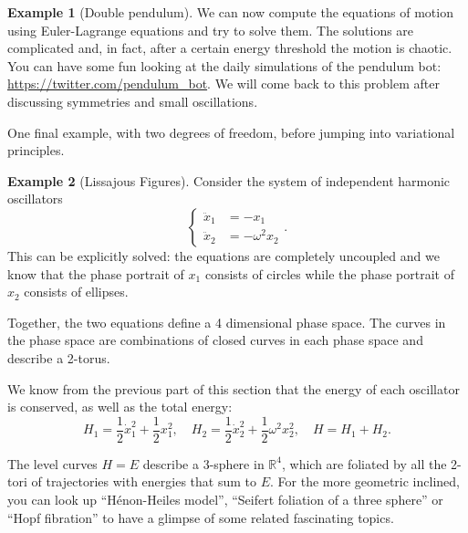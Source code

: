 \documentclass[english,fontsize=11pt,paper=b5]{scrbook}
\theoremstyle{definition}
\newtheorem{example}{Example}[chapter]
\begin{document}
\begin{example}[Double pendulum]
      We can now compute the equations of motion using Euler-Lagrange equations and try to solve them.
      The solutions are complicated and, in fact, after a certain energy threshold the motion is chaotic.
      You can have some fun looking at the daily simulations of the pendulum bot: \url{https://twitter.com/pendulum_bot}.
      We will come back to this problem after discussing symmetries and small oscillations.
    \end{example}

    One final example, with two degrees of freedom, before jumping into variational principles.

    \begin{example}[Lissajous Figures]\label{exa:lissajous}
      Consider the system of independent harmonic oscillators
      \begin{equation}
        \left\lbrace
          \begin{aligned}
            \ddot x_1 & = -x_1          \\
            \ddot x_2 & = -\omega^2 x_2
          \end{aligned}
        \right..
      \end{equation}
      This can be explicitly solved: the equations are completely uncoupled and we know that the phase portrait of $x_1$ consists of circles while the phase portrait of $x_2$ consists of ellipses.

      Together, the two equations define a 4 dimensional phase space. The curves in the phase space are combinations of closed curves in each phase space and describe a 2-torus.

      We know from the previous part of this section that the energy of each oscillator is conserved, as well as the total energy:
      \begin{equation}
        H_1 = \frac12\dot x_1^2 + \frac12 x_1^2, \quad
        H_2 = \frac12\dot x_2^2 + \frac12 \omega^2 x_2^2, \quad
        H = H_1 + H_2.
      \end{equation}

      The level curves $H=E$ describe a 3-sphere in $\mathbb{R}^4$, which are foliated by all the 2-tori of trajectories with energies that sum to $E$. For the more geometric inclined, you can look up ``H\'enon-Heiles model'', ``Seifert foliation of a three sphere'' or ``Hopf fibration'' to have a glimpse of some related fascinating topics.


\end{example}
\end{document}
